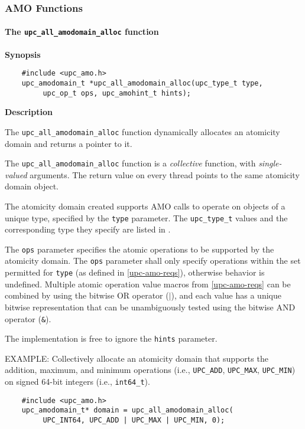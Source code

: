 \subsubsection{AMO Functions}
\label{upc-amo-functions}

\paragraph{The {\tt upc\_all\_amodomain\_alloc} function}

{\bf Synopsis}

\npf\vspace{-1.8em}
\begin{verbatim}
    #include <upc_amo.h>
    upc_amodomain_t *upc_all_amodomain_alloc(upc_type_t type,
         upc_op_t ops, upc_amohint_t hints);
\end{verbatim}

{\bf Description}

\np The {\tt upc\_all\_amodomain\_alloc} function dynamically allocates an
    atomicity domain and returns a pointer to it.

\np The {\tt upc\_all\_amodomain\_alloc} function is a {\em collective} function,
    with {\em single-valued} arguments.
    The return value on every thread points to the same atomicity domain
    object.

\np The atomicity domain created supports AMO calls to operate on objects of a
    unique type, specified by the {\tt type} parameter.  The {\tt upc\_type\_t}
    values and the corresponding type they specify are listed in
    \upctypesection{}.

\np The {\tt ops} parameter specifies the atomic operations to be supported by
    the atomicity domain.  The {\tt ops} parameter shall only specify
    operations within the set permitted for {\tt type} (as defined in
    \ref{upc-amo-reqs}), otherwise behavior is undefined.
    Multiple atomic operation value macros from \ref{upc-amo-reqs}
    can be combined by using the bitwise OR operator ($|$), and each value has
    a unique bitwise representation that can be unambiguously tested using the
    bitwise AND operator ({\tt \&}).

\np The implementation is free to ignore the {\tt hints} parameter.

\np EXAMPLE: Collectively allocate an atomicity domain that supports the
    addition, maximum, and minimum operations (i.e., {\tt UPC\_ADD},
    {\tt UPC\_MAX}, {\tt UPC\_MIN}) on signed 64-bit integers (i.e.,
    {\tt int64\_t}).
\begin{verbatim}
    #include <upc_amo.h>
    upc_amodomain_t* domain = upc_all_amodomain_alloc(
         UPC_INT64, UPC_ADD | UPC_MAX | UPC_MIN, 0);
\end{verbatim}
\vfill

